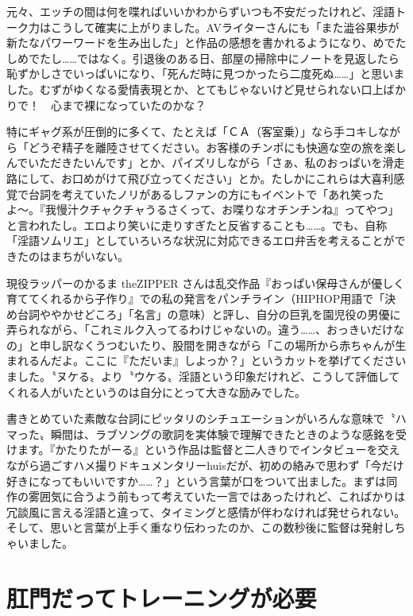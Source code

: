 \documentclass[12pt,UTF8]{ctexbook}
\begin{document}
元々、エッチの間は何を喋ればいいかわからずいつも不安だったけれど、淫語トーク力はこうして確実に上がりました。AVライターさんにも「また澁谷果歩が新たなパワーワードを生み出した」と作品の感想を書かれるようになり、めでたしめでたし……ではなく。引退後のある日、部屋の掃除中にノートを見返したら恥ずかしさでいっぱいになり、「死んだ時に見つかったら二度死ぬ……」と思いました。むずがゆくなる愛情表現とか、とてもじゃないけど見せられない口上ばかりで！　心まで裸になっていたのかな？

特にギャグ系が圧倒的に多くて、たとえば「ＣＡ（客室乗）」なら手コキしながら「どうぞ精子を離陸させてください。お客様のチンポにも快適な空の旅を楽しんでいただきたいんです」とか、パイズリしながら「さぁ、私のおっぱいを滑走路にして、お口めがけて飛び立ってください」とか。たしかにこれらは大喜利感覚で台詞を考えていたノリがあるしファンの方にもイベントで「あれ笑ったよ〜。『我慢汁クチャクチャうるさくって、お喋りなオチンチンね』ってやつ」と言われたし。エロより笑いに走りすぎたと反省することも……。でも、自称「淫語ソムリエ」としていろいろな状況に対応できるエロ弁舌を考えることができたのはまちがいない。

現役ラッパーのかるま theZIPPER さんは乱交作品『おっぱい保母さんが優しく育ててくれるから子作り』での私の発言をパンチライン（HIPHOP用語で「決め台詞ややかせどころ」「名言」の意味）と評し、自分の巨乳を園児役の男優に弄られながら、「これミルク入ってるわけじゃないの。違う……、おっきいだけなの」と申し訳なくうつむいたり、股間を開きながら「この場所から赤ちゃんが生まれるんだよ。ここに『ただいま』しよっか？」というカットを挙げてくださいました。〝ヌケる〟より〝ウケる〟淫語という印象だけれど、こうして評価してくれる人がいたというのは自分にとって大きな励みでした。

書きとめていた素敵な台詞にピッタリのシチュエーションがいろんな意味で〝ハマった〟瞬間は、ラブソングの歌詞を実体験で理解できたときのような感銘を受けます。『かたりたがーる』という作品は監督と二人きりでインタビューを交えながら過ごすハメ撮りドキュメンタリーhuisだが、初めの絡みで思わず「今だけ好きになってもいいですか……？」という言葉が口をついて出ました。まずは同作の雾囲気に合うよう前もって考えていた一言ではあったけれど、こればかりは冗談風に言える淫語と違って、タイミングと感情が伴わなければ発せられない。そして、思いと言葉が上手く重なり伝わったのか、この数秒後に監督は発射しちゃいました。

\switchcolumn

\section{肛門だってトレーニングが必要}
\end{document}
